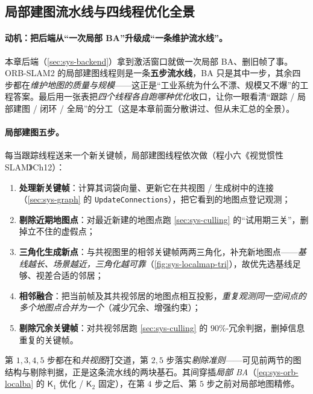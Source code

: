 \subsection{局部建图流水线与四线程优化全景}
\label{sec:sys-localmapping-orb}

\paragraph{动机：把后端从“一次局部 BA”升级成“一条维护流水线”。}
本章后端（\cref{sec:sys-backend}）拿到激活窗口就做一次局部 BA、删旧帧了事。ORB-SLAM2 的局部建图线程则是一条\textbf{五步流水线}，BA 只是其中一步，其余四步都在\emph{维护地图的质量与规模}——这正是“工业系统为什么不漂、规模又不爆”的工程答案。最后用一张表把\emph{四个线程各自跑哪种优化}收口，让你一眼看清“跟踪 / 局部建图 / 闭环 / 全局”的分工（这是本章前面分散讲过、但从未汇总的全景）。

\paragraph{局部建图五步。}
每当跟踪线程送来一个新关键帧，局部建图线程依次做（程小六《视觉惯性 SLAM》Ch12）：
\begin{enumerate}
  \item \textbf{处理新关键帧}：计算其词袋向量、更新它在共视图 / 生成树中的连接（\cref{sec:sys-graph} 的 \texttt{UpdateConnections}），把它看到的地图点登记观测；
  \item \textbf{剔除近期地图点}：对最近新建的地图点跑 \cref{sec:sys-culling} 的“试用期三关”，删掉立不住的虚假点；
  \item \textbf{三角化生成新点}：与共视图里的相邻关键帧两两三角化，补充新地图点——\emph{基线越长、场景越近，三角化越可靠}（\cref{fig:sys-localmap-tri}），故优先选基线足够、视差合适的邻居；
  \item \textbf{相邻融合}：把当前帧及其共视邻居的地图点相互投影，\emph{重复观测同一空间点的多个地图点合并为一个}（减少冗余、增强约束）；
  \item \textbf{剔除冗余关键帧}：对共视邻居跑 \cref{sec:sys-culling} 的 $90\%$-冗余判据，删掉信息重复的关键帧。
\end{enumerate}
第 $1,3,4,5$ 步都在和\emph{共视图}打交道，第 $2,5$ 步落实\emph{剔除准则}——可见前两节的图结构与剔除判据，正是这条流水线的两块基石。其间穿插\emph{局部 BA}（\cref{eq:sys-orb-localba} 的 $\mathsf{K}_1$ 优化 / $\mathsf{K}_2$ 固定），在第 $4$ 步之后、第 $5$ 步之前对局部地图精修。

